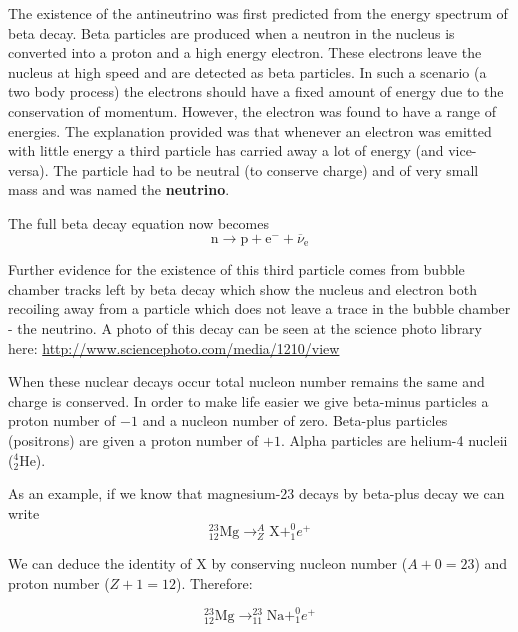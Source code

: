 \documentclass[revision-guide.tex]{subfiles}
\begin{document}

The existence of the antineutrino was first predicted from the energy spectrum of beta decay. Beta particles are produced when a neutron in the nucleus is converted into a proton and a high energy electron. These electrons leave the nucleus at high speed and are detected as beta particles. In such a scenario (a two body process) the electrons should have a fixed amount of energy due to the conservation of momentum. However, the electron was found to have a range of energies. The explanation provided was that whenever an electron was emitted with little energy a third particle has carried away a lot of energy (and vice-versa). The particle had to be neutral (to conserve charge) and of very small mass and was named the \textbf{neutrino}.

The full beta decay equation now becomes
\[ \text{n} \rightarrow \text{p} + \text{e}^- + \overline{\nu}_\text{e} \]

Further evidence for the existence of this third particle comes from bubble chamber tracks left by beta decay which show the nucleus and electron both recoiling away from a particle which does not leave a trace in the bubble chamber - the neutrino. A photo of this decay can be seen at the science photo library here: \url{http://www.sciencephoto.com/media/1210/view}


When these nuclear decays occur total nucleon number remains the same and charge is conserved. In order to make life easier we give beta-minus particles a proton number of $-1$ and a nucleon number of zero. Beta-plus particles (positrons) are given a proton number of $+1$. Alpha particles are helium-4 nucleii ($_2^4\text{He}$).

As an example, if we know that magnesium-23 decays by beta-plus decay we can write
\[ _{12}^{23}\text{Mg} \rightarrow _Z^A\text{X} + _{1}^{0}e^+ \]

We can deduce the identity of X by conserving nucleon number ($A+0=23$) and proton number ($Z+1 = 12$). Therefore:

\[ _{12}^{23}\text{Mg} \rightarrow _{11}^{23}\text{Na} + _{1}^{0}e^+ \]

\end{document}
